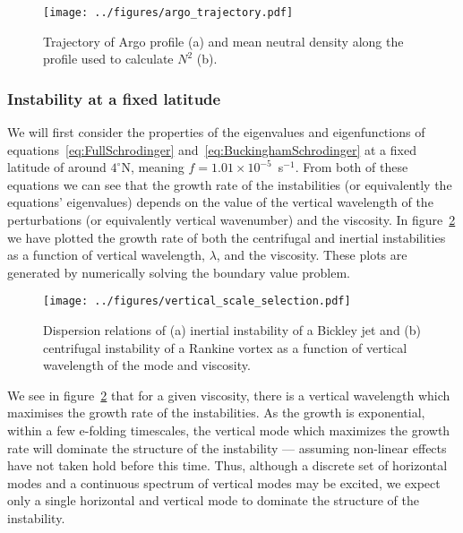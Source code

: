 \begin{figure}
    \centering
    \texttt{[image: ../figures/argo\_trajectory.pdf]}
    \caption{Trajectory of Argo profile (a) and mean neutral density along the profile used to calculate $N^2$ (b).}
    \label{fig:InitialStratification}
\end{figure}

\subsubsection{Instability at a fixed latitude}
We will first consider the properties of the eigenvalues and eigenfunctions of equations~\ref{eq:FullSchrodinger} and~\ref{eq:BuckinghamSchrodinger} at a fixed latitude of around $4^\circ$N, meaning $f = 1.01 \times 10^{-5}$~s$^{-1}$. From both of these equations we can see that the growth rate of the instabilities (or equivalently the equations' eigenvalues) depends on the value of the vertical wavelength of the perturbations (or equivalently vertical wavenumber) and the viscosity. In figure~\ref{fig:DispersionRelation} we have plotted the growth rate of both the centrifugal and inertial instabilities as a function of vertical wavelength, $\lambda$, and the viscosity. These plots are generated by numerically solving the boundary value problem.

\begin{figure}
    \centering
    \texttt{[image: ../figures/vertical\_scale\_selection.pdf]}
    \caption{Dispersion relations of (a) inertial instability of a Bickley jet and (b) centrifugal instability of a Rankine vortex as a function of vertical wavelength of the mode and viscosity.}
    \label{fig:DispersionRelation}
\end{figure}

We see in figure~\ref{fig:DispersionRelation} that for a given viscosity, there is a vertical wavelength which maximises the growth rate of the instabilities. As the growth is exponential, within a few e-folding timescales, the vertical mode which maximizes the growth rate will dominate the structure of the instability --- assuming non-linear effects have not taken hold before this time. Thus, although a discrete set of horizontal modes and a continuous spectrum of vertical modes may be excited, we expect only a single horizontal and vertical mode to dominate the structure of the instability.


